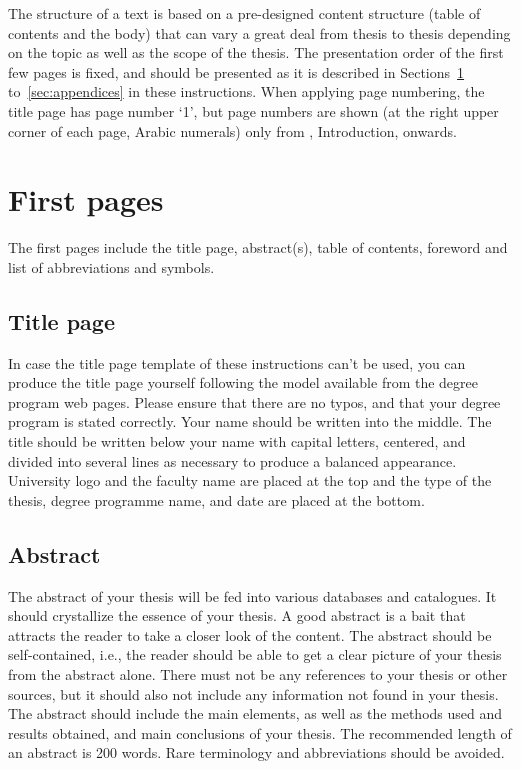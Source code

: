 
The structure of a text is based on a pre-designed content structure (table of contents and the body) that can vary a great deal from thesis to thesis depending on the topic as well as the scope of the thesis. The presentation order of the first few pages is fixed, and should be presented as it is described in Sections~\ref{sec:first_pages} to~\ref{sec:appendices} in these instructions. When applying page numbering, the title page has page number ‘1’, but page numbers are shown (at the right upper corner of each page, Arabic numerals) only from , Introduction, onwards.

\section{First pages}
\label{sec:first_pages}
The first pages include the title page, abstract(s), table of contents, foreword and list of abbreviations and symbols. 

\subsection{Title page}

In case the title page template of these instructions can't be used, you can produce the title page yourself following the model available from the degree program web pages. Please ensure that there are no typos, and that your degree program is stated correctly. Your name should be written into the middle. The title should be written below your name with capital letters, centered, and divided into several lines as necessary to produce a balanced appearance. University logo and the faculty name are placed at the top and the type of the thesis, degree programme name, and date are placed at the bottom.

\subsection{Abstract}

The abstract of your thesis will be fed into various databases and catalogues. It should crystallize the essence of your thesis. A good abstract is a bait that attracts the reader to take a closer look of the content. The abstract should be self-contained, i.e., the reader should be able to get a clear picture of your thesis from the abstract alone. There must not be any references to your thesis or other sources, but it should also not include any information not found in your thesis. The abstract should include the main elements, as well as the methods used and results obtained, and main conclusions of your thesis. The recommended length of an abstract is 200 words. Rare terminology and abbreviations should be avoided. 

